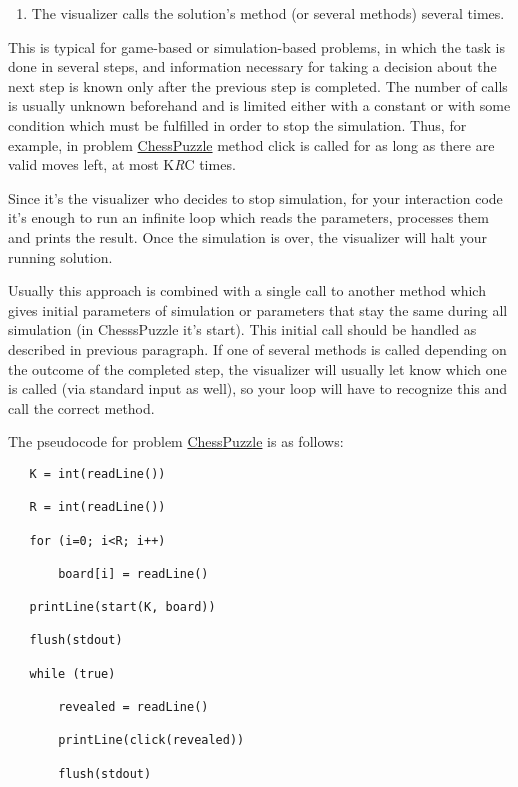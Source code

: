\documentclass[]{article}
\providecommand{\tightlist}{%
  \setlength{\itemsep}{0pt}\setlength{\parskip}{0pt}}
\begin{document}
\begin{enumerate}
\def\labelenumi{\arabic{enumi}.}
\setcounter{enumi}{1}
\tightlist
\item
  The visualizer calls the solution's method (or several methods)
  several times.
\end{enumerate}

This is typical for game-based or simulation-based problems, in which
the task is done in several steps, and information necessary for taking
a decision about the next step is known only after the previous step is
completed. The number of calls is usually unknown beforehand and is
limited either with a constant or with some condition which must be
fulfilled in order to stop the simulation. Thus, for example, in problem
\href{http://www.topcoder.com/longcontest/?module=ViewProblemStatement\&rd=14195\&pm=10728}{ChessPuzzle}
method click is called for as long as there are valid moves left, at
most K\emph{R}C times.

Since it's the visualizer who decides to stop simulation, for your
interaction code it's enough to run an infinite loop which reads the
parameters, processes them and prints the result. Once the simulation is
over, the visualizer will halt your running solution.

Usually this approach is combined with a single call to another method
which gives initial parameters of simulation or parameters that stay the
same during all simulation (in ChesssPuzzle it's start). This initial
call should be handled as described in previous paragraph. If one of
several methods is called depending on the outcome of the completed
step, the visualizer will usually let know which one is called (via
standard input as well), so your loop will have to recognize this and
call the correct method.

The pseudocode for problem
\href{http://www.topcoder.com/longcontest/?module=ViewProblemStatement\&rd=14195\&pm=10728}{ChessPuzzle}
is as follows:

\begin{verbatim}
   K = int(readLine())

   R = int(readLine())

   for (i=0; i<R; i++)

       board[i] = readLine()

   printLine(start(K, board))

   flush(stdout)

   while (true)

       revealed = readLine()

       printLine(click(revealed))

       flush(stdout)
\end{verbatim}
\end{document}
